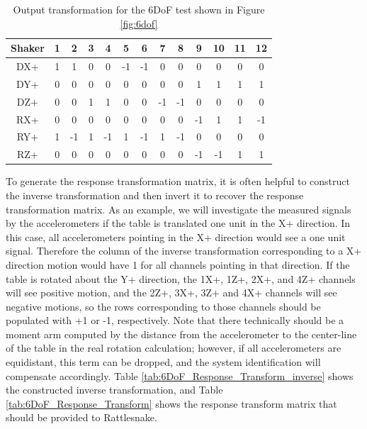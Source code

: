 \documentclass[pdf,12pt,report]{SANDreport}
\begin{document}
    \begin{table}
        \centering
        \caption{Output transformation for the \ac{6DoF} test shown in Figure \ref{fig:6dof}}
        \label{tab:6DoF_Output_Transform}
        \begin{tabular}{c|cccccccccccc}
            Shaker & 1 & 2 & 3 & 4 & 5 & 6 & 7 & 8 & 9 & 10 & 11 & 12 \\
            \hline
            DX+ & 1 & 1 & 0 & 0 & -1 & -1 & 0 & 0 & 0 & 0 & 0 & 0 \\
            DY+ & 0 & 0 & 0 & 0 & 0 & 0 & 0 & 0 & 1 & 1 & 1 & 1 \\
            DZ+ & 0 & 0 & 1 & 1 & 0 & 0 & -1 & -1 & 0 & 0 & 0 & 0 \\
            RX+ & 0 & 0 & 0 & 0 & 0 & 0 & 0 & 0 & -1 & 1 & 1 & -1 \\
            RY+ & 1 & -1 & 1 & -1 & 1 & -1 & 1 & -1 & 0 & 0 & 0 & 0 \\
            RZ+ & 0 & 0 & 0 & 0 & 0 & 0 & 0 & 0 & -1 & -1 & 1 & 1 \\
        \end{tabular}
    \end{table}

    To generate the response transformation matrix, it is often helpful to construct the inverse transformation and then invert it to recover the response transformation matrix.  As an example, we will investigate the measured signals by the accelerometers if the table is translated one unit in the X+ direction.  In this case, all accelerometers pointing in the X+ direction would see a one unit signal.  Therefore the column of the inverse transformation corresponding to a X+ direction motion would have 1 for all channels pointing in that direction.  If the table is rotated about the Y+ direction, the 1X+, 1Z+, 2X+, and 4Z+ channels will see positive motion, and the 2Z+, 3X+, 3Z+ and 4X+ channels will see negative motions, so the rows corresponding to those channels should be populated with +1 or -1, respectively.  Note that there technically should be a moment arm computed by the distance from the accelerometer to the center-line of the table in the real rotation calculation; however, if all accelerometers are equidistant, this term can be dropped, and the system identification will compensate accordingly.  Table \ref{tab:6DoF_Response_Transform_inverse} shows the constructed inverse transformation, and Table \ref{tab:6DoF_Response_Transform} shows the response transform matrix that should be provided to Rattlesnake.
    
\end{document}

